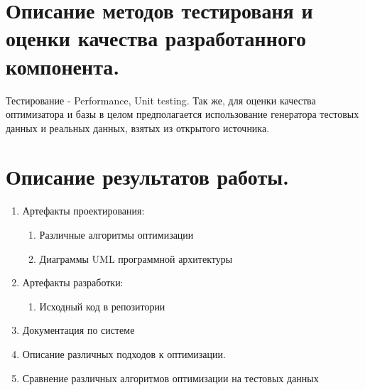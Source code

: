 \documentclass[12pt]{article}
\begin{document}
    \section{Описание методов тестированя и оценки качества разработанного компонента.}
        Тестирование - Performance, Unit testing. Так же, для оценки качества оптимизатора и базы в целом предполагается использование генератора тестовых данных и реальных данных, взятых из открытого источника.
    \section{Описание результатов работы.}
        \begin{enumerate}\itemsep1pt \parskip0pt 
        	\item Артефакты проектирования:
            	\begin{enumerate}\itemsep1pt \parskip0pt  
            	    \item Различные алгоритмы оптимизации
            	    \item Диаграммы UML программной архитектуры
            	\end{enumerate}
        	\item Артефакты разработки:
            	\begin{enumerate}\itemsep1pt \parskip0pt  
            	    \item Исходный код в репозитории
            	\end{enumerate}
    	    \item Документация по системе
    	    \item Описание различных подходов к оптимизации.
    	    \item Сравнение различных алгоритмов оптимизации на тестовых данных
        \end{enumerate}
\end{document}
